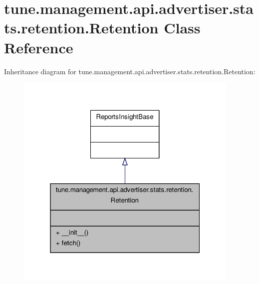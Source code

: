 \hypertarget{classtune_1_1management_1_1api_1_1advertiser_1_1stats_1_1retention_1_1Retention}{\section{tune.\-management.\-api.\-advertiser.\-stats.\-retention.\-Retention Class Reference}
\label{classtune_1_1management_1_1api_1_1advertiser_1_1stats_1_1retention_1_1Retention}
}


Inheritance diagram for tune.\-management.\-api.\-advertiser.\-stats.\-retention.\-Retention\-:
\nopagebreak
\begin{figure}[H]
\begin{center}
\leavevmode
\includegraphics[width=304pt]{classtune_1_1management_1_1api_1_1advertiser_1_1stats_1_1retention_1_1Retention__inherit__graph}
\end{center}
\end{figure}



